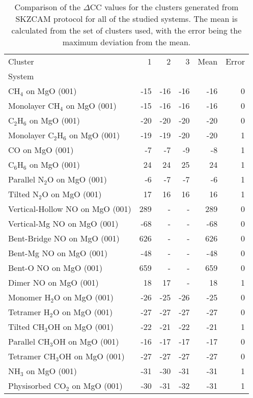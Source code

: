 \begin{table}
\caption{\label{tab:deltacc}Comparison of the $\Delta$CC values for the clusters generated from SKZCAM protocol for all of the studied systems. The mean is calculated from the set of clusters used, with the error being the maximum deviation from the mean.}
\begin{adjustbox}{center,max width=1\textwidth}
\begin{tabular}{lrrrrr}
\toprule
Cluster & 1 & 2 & 3 & Mean & Error \\ 
System &  &  &  &  &  \\
\midrule
CH$_4$ on MgO (001) & -15 & -16 & -16 & -16 & 0 \\
Monolayer CH$_4$ on MgO (001) & -15 & -16 & -16 & -16 & 0 \\
C$_2$H$_6$ on MgO (001) & -20 & -20 & -20 & -20 & 0 \\
Monolayer C$_2$H$_6$ on MgO (001) & -19 & -19 & -20 & -20 & 1 \\
CO on MgO (001) & -7 & -7 & -9 & -8 & 1 \\
C$_6$H$_6$ on MgO (001) & 24 & 24 & 25 & 24 & 1 \\
Parallel N$_2$O on MgO (001) & -6 & -7 & -7 & -6 & 1 \\
Tilted N$_2$O on MgO (001) & 17 & 16 & 16 & 16 & 1 \\
Vertical-Hollow NO on MgO (001) & 289 & - & - & 289 & 0 \\
Vertical-Mg NO on MgO (001) & -68 & - & - & -68 & 0 \\
Bent-Bridge NO on MgO (001) & 626 & - & - & 626 & 0 \\
Bent-Mg NO on MgO (001) & -48 & - & - & -48 & 0 \\
Bent-O NO on MgO (001) & 659 & - & - & 659 & 0 \\
Dimer NO on MgO (001) & 18 & 17 & - & 18 & 1 \\
Monomer H$_2$O on MgO (001) & -26 & -25 & -26 & -25 & 0 \\
Tetramer H$_2$O on MgO (001) & -27 & -27 & -27 & -27 & 0 \\
Tilted CH$_3$OH on MgO (001) & -22 & -21 & -22 & -21 & 1 \\
Parallel CH$_3$OH on MgO (001) & -16 & -17 & -17 & -17 & 0 \\
Tetramer CH$_3$OH on MgO (001) & -27 & -27 & -27 & -27 & 0 \\
NH$_3$ on MgO (001) & -31 & -30 & -31 & -31 & 1 \\
Physisorbed CO$_2$ on MgO (001) & -30 & -31 & -32 & -31 & 1 \\

\end{tabular}
\end{adjustbox}
\end{table}
